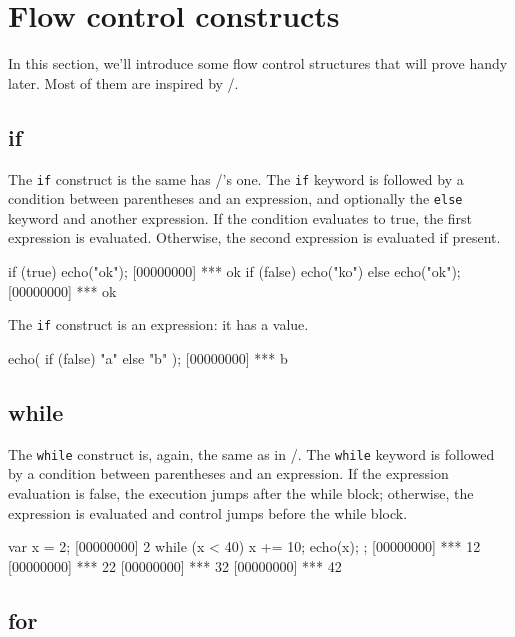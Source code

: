 \chapter{Flow control constructs}
\label{sec:tut:flow}

In this section, we'll introduce some flow control structures that
will prove handy later. Most of them are inspired by \C/\Cxx.

\section{if}

The \lstinline{if} construct is the same has \C/\Cxx's one. The
\lstinline{if} keyword is followed by a condition between parentheses and
an expression, and optionally the \lstinline{else} keyword and another
expression. If the condition evaluates to true, the first expression
is evaluated. Otherwise, the second expression is evaluated if
present.

\begin{urbiscript}
if (true)
  echo("ok");
[00000000] *** ok
if (false)
  echo("ko")
else
  echo("ok");
[00000000] *** ok
\end{urbiscript}

The \lstinline|if| construct is an expression: it has a value.

\begin{urbiscript}
echo({ if (false) "a" else "b" });
[00000000] *** b
\end{urbiscript}

\section{while}

The \lstinline{while} construct is, again, the same as in \C/\Cxx. The
\lstinline{while} keyword is followed by a condition between parentheses
and an expression. If the expression evaluation is false, the
execution jumps after the while block; otherwise, the expression is
evaluated and control jumps before the while block.

\begin{urbiscript}
var x = 2;
[00000000] 2
while (x < 40)
{
  x += 10;
  echo(x);
};
[00000000] *** 12
[00000000] *** 22
[00000000] *** 32
[00000000] *** 42
\end{urbiscript}

\section{for}

